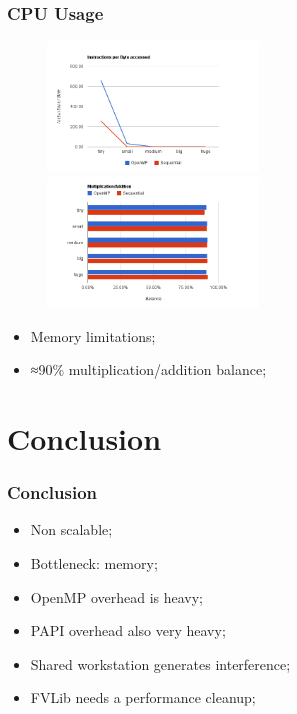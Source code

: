 \documentclass{beamer}
\begin{document}
\begin{frame}
	\frametitle{CPU Usage}

\begin{figure}
\begin{center}
\includegraphics[width=0.5\textwidth]{images/pfac/chrtipb.png}
\includegraphics[width=0.5\textwidth]{images/pfac/chrtmab.png}
\end{center}
\end{figure}

\begin{itemize}
\item{Memory limitations;}
\item{≈90\% multiplication/addition balance;}
\end{itemize}

\end{frame}








\section{Conclusion}
\begin{frame}
	\frametitle{Conclusion}

\begin{itemize}
\item{Non scalable;}
\item{Bottleneck: memory;}
\item{OpenMP overhead is heavy;}
\item{PAPI overhead also very heavy;}
\item{Shared workstation generates interference;}
\item{FVLib needs a performance cleanup;}
\end{itemize}

\end{frame}
\end{document}
